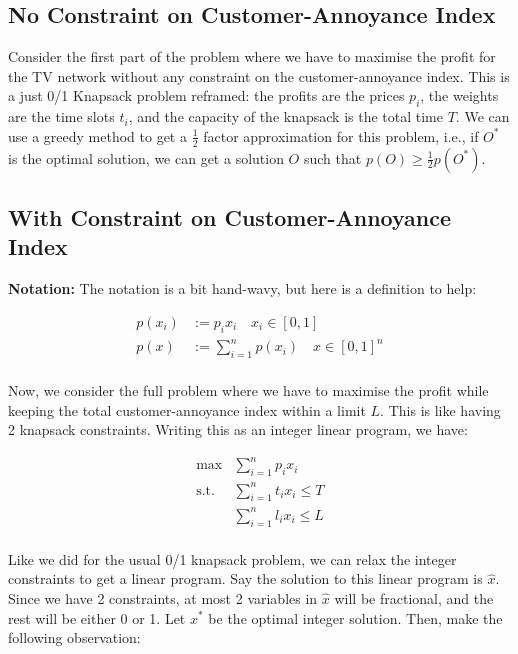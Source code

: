 \documentclass[a4paper]{article}
\begin{document}
\subsection*{No Constraint on Customer-Annoyance Index}
Consider the first part of the problem where we have to maximise the profit for the TV network without any constraint on the customer-annoyance index. This is a just 0/1 Knapsack problem reframed: the profits are the prices $p_i$, the weights are the time slots $t_i$, and the capacity of the knapsack is the total time $T$. We can use a greedy method to get a $\frac{1}{2}$ factor approximation for this problem, i.e., if $O^*$ is the optimal solution, we can get a solution $O$ such that $p(O) \geq \frac{1}{2} p(O^*)$.
 
\vspace{0.2in}
\subsection*{With Constraint on Customer-Annoyance Index}
\textbf{Notation:} The notation is a bit hand-wavy, but here is a definition to help:

\begin{align*}
    p(x_i) & := p_i x_i \quad x_i \in [0, 1] \\
    p(x) & := \sum_{i=1}^{n} p(x_i) \quad x \in [0, 1]^n \\
\end{align*}

\noindent
Now, we consider the full problem where we have to maximise the profit while keeping the total customer-annoyance index within a limit $L$. This is like having 2 knapsack constraints. Writing this as an integer linear program, we have:

\begin{align*}
\text{max} & \sum_{i=1}^{n} p_i x_i \\
\text{s.t.} & \sum_{i=1}^{n} t_i x_i \leq T \\
& \sum_{i=1}^{n} l_i x_i \leq L \\
\end{align*}

\noindent
Like we did for the usual 0/1 knapsack problem, we can relax the integer constraints to get a linear program. Say the solution to this linear program is $\hat{x}$. Since we have 2 constraints, at most 2 variables in $\hat{x}$ will be fractional, and the rest will be either 0 or 1. Let $x^*$ be the optimal integer solution. Then, make the following observation:
\end{document}

